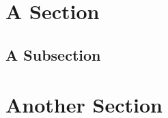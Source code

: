 \documentclass[a4paper, 12pt, oneside]{Thesis}  %
\begin{document}
\section{A Section}


\subsection{A Subsection}


\section{Another Section}












\appendix %

\label{morethan}

\label{distinct}

\label{handover}


\backmatter

\label{Bibliography}
\end{document}
